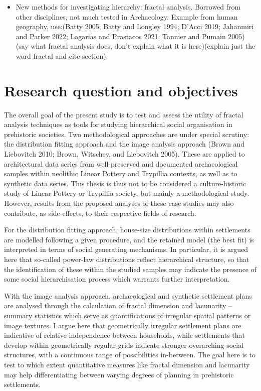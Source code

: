 \documentclass[
  12pt,
]{book}
\begin{document}
\begin{itemize}
\item
  New methods for investigating hierarchy: fractal analysis. Borrowed from other disciplines, not much tested in Archaeology. Example from human geography, use:(Batty 2005; Batty and Longley 1994; D'Acci 2019; Jahanmiri and Parker 2022; Lagarias and Prastacos 2021; Tannier and Pumain 2005) (say what fractal analysis does, don't explain what it is here)(explain just the word fractal and cite section).
\end{itemize}

\hypertarget{research-question-and-objectives}{%
\section{Research question and objectives}\label{research-question-and-objectives}}

The overall goal of the present study is to test and assess the utility of fractal analysis techniques as tools for studying hierarchical social organisation in prehistoric societies. Two methodological approaches are under special scrutiny: the distribution fitting approach and the image analysis approach (Brown and Liebovitch 2010; Brown, Witschey, and Liebovitch 2005). These are applied to architectural data series from well-preserved and documented archaeological samples within neolithic Linear Pottery and Trypillia contexts, as well as to synthetic data series. This thesis is thus not to be considered a culture-historic study of Linear Pottery or Trypillia society, but mainly a methodological study. However, results from the proposed analyses of these case studies may also contribute, as side-effects, to their respective fields of research.

For the distribution fitting approach, house-size distributions within settlements are modelled following a given procedure, and the retained model (the best fit) is interpreted in terms of social generating mechanisms. In particular, it is argued here that so-called power-law distributions reflect hierarchical structure, so that the identification of these within the studied samples may indicate the presence of some social hierarchisation process which warrants further interpretation.

With the image analysis approach, archaeological and synthetic settlement plans are analysed through the calculation of fractal dimension and lacunarity -- summary statistics which serve as quantifications of irregular spatial patterns or image textures. I argue here that geometrically irregular settlement plans are indicative of relative independence between households, while settlements that develop within geometrically regular grids indicate stronger overarching social structures, with a continuous range of possibilities in-between. The goal here is to test to which extent quantitative measures like fractal dimension and lacunarity may help differentiating between varying degrees of planning in prehistoric settlements.
\end{document}
